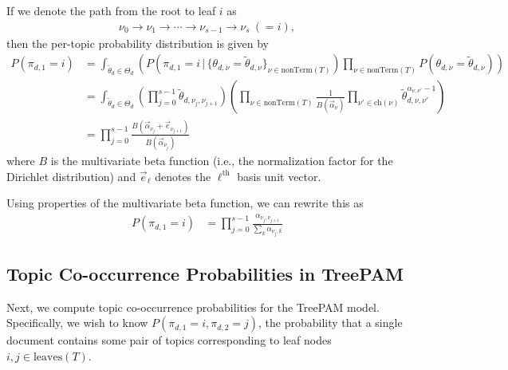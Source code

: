 \documentclass{article}
\theoremstyle{definition}
\newcommand{\nth}{^{\text{th}}}
\newcommand{\leaves}{\text{leaves}}
\newcommand{\nonTerm}{\text{nonTerm}}
\begin{document}
If we denote the path from the root to leaf $i$ as
\begin{align*}
\nu_0 \to \nu_1 \to \cdots \to \nu_{s-1} \to \nu_s \ (=i),
\end{align*}
then the per-topic probability distribution is given by
\begin{align*}
P(\pi_{d,1} = i)
&=
\int_{\tilde \theta_d \in \Theta_d}
  \left(
  P\left(\pi_{d,1}=i \,|\, \{ \theta_{d,\nu} = \tilde \theta_{d,\nu} \}_{\nu \in \nonTerm(T)}\right)
  \prod_{\nu \in \nonTerm(T)} P\left(\theta_{d,\nu} = \tilde \theta_{d,\nu}\right)
  \right)
\\
&=
\int_{\tilde \theta_d \in \Theta_d}
  \left(
  \prod_{j=0}^{s-1} \tilde \theta_{d,\nu_j,\nu_{j+1}}
  \right)
  \left(
  \prod_{\nu \in \nonTerm(T)}
  \frac{1}{B(\vec\alpha_\nu)}
  \prod_{\nu' \in \text{ch}(\nu)}
  \tilde \theta_{d,\nu,\nu'}^{\alpha_{\nu,\nu'}-1}
  \right)
\\
&=
\prod_{j=0}^{s-1}
  \frac{B(\vec\alpha_{\nu_j} + \vec e_{\nu_{j+1}})}
       {B(\vec\alpha_{\nu_j})}
\end{align*}
where $B$ is the multivariate beta function (i.e., the normalization factor for the Dirichlet distribution) and $\vec e_\ell$ denotes the $\ell\nth$ basis unit vector.

Using properties of the multivariate beta function, we can rewrite this as
\begin{align*}
P(\pi_{d,1} = i)
&=
\prod_{j=0}^{s-1}
  \frac{\alpha_{\nu_j,\nu_{j+1}}}
       {\sum_{k} \alpha_{\nu_j,k}}
\end{align*}

\subsection{Topic Co-occurrence Probabilities in TreePAM}

Next, we compute topic co-occurrence probabilities for the TreePAM model.
Specifically, we wish to know $P(\pi_{d,1} = i, \pi_{d,2} = j)$, the probability that a single document contains some pair of topics corresponding to leaf nodes $i, j \in \leaves(T)$.
\end{document}
